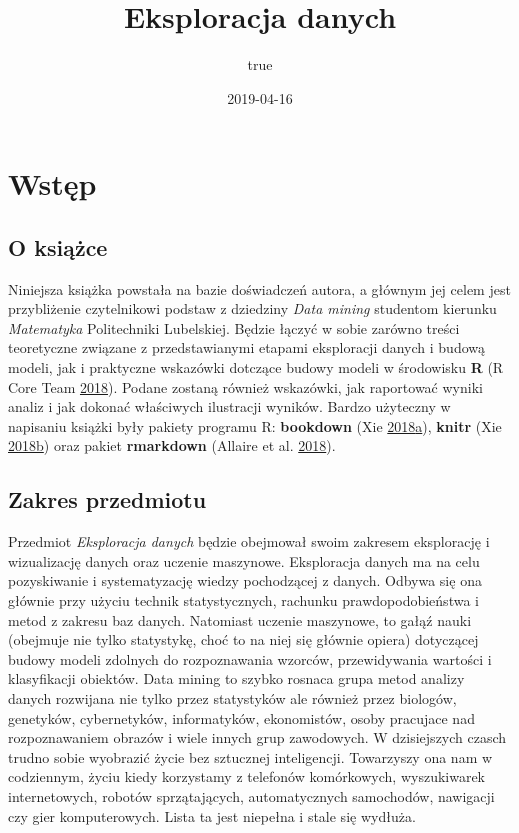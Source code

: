 \documentclass[]{book}
\title{Eksploracja danych}
\author{true}
\date{2019-04-16}
\theoremstyle{plain}
\theoremstyle{definition}
\theoremstyle{definition}
\theoremstyle{definition}
\theoremstyle{definition}
\theoremstyle{remark}
\begin{document}
\maketitle

{
\setcounter{tocdepth}{1}
\tableofcontents
}
\hypertarget{wstep}{%
\chapter*{Wstęp}\label{wstep}}

\hypertarget{o-ksiazce}{%
\section*{O książce}\label{o-ksiazce}}

Niniejsza książka powstała na bazie doświadczeń autora, a głównym jej celem jest przybliżenie czytelnikowi podstaw z dziedziny \emph{Data mining} studentom kierunku \emph{Matematyka} Politechniki Lubelskiej. Będzie łączyć w sobie zarówno treści teoretyczne związane z przedstawianymi etapami eksploracji danych i budową modeli, jak i praktyczne wskazówki dotczące budowy modeli w środowisku \textbf{R} (R Core Team \protect\hyperlink{ref-R-base}{2018}). Podane zostaną również wskazówki, jak raportować wyniki analiz i jak dokonać właściwych ilustracji wyników. Bardzo użyteczny w napisaniu książki były pakiety programu R: \textbf{bookdown} (Xie \protect\hyperlink{ref-R-bookdown}{2018}\protect\hyperlink{ref-R-bookdown}{a}), \textbf{knitr} (Xie \protect\hyperlink{ref-R-knitr}{2018}\protect\hyperlink{ref-R-knitr}{b}) oraz pakiet \textbf{rmarkdown} (Allaire et al. \protect\hyperlink{ref-R-rmarkdown}{2018}).

\hypertarget{zakres-przedmiotu}{%
\section*{Zakres przedmiotu}\label{zakres-przedmiotu}}

Przedmiot \emph{Eksploracja danych} będzie obejmował swoim zakresem eksplorację i wizualizację danych oraz uczenie maszynowe. Eksploracja danych ma na celu pozyskiwanie i systematyzację wiedzy pochodzącej z danych. Odbywa się ona głównie przy użyciu technik statystycznych, rachunku prawdopodobieństwa i metod z zakresu baz danych. Natomiast uczenie maszynowe, to gałąź nauki (obejmuje nie tylko statystykę, choć to na niej się głównie opiera) dotyczącej budowy modeli zdolnych do rozpoznawania wzorców, przewidywania wartości i klasyfikacji obiektów. Data mining to szybko rosnaca grupa metod analizy danych rozwijana nie tylko przez statystyków ale również przez biologów, genetyków, cybernetyków, informatyków, ekonomistów, osoby pracujace nad rozpoznawaniem obrazów i wiele innych grup zawodowych. W dzisiejszych czasch trudno sobie wyobrazić życie bez sztucznej inteligencji. Towarzyszy ona nam w codziennym, życiu kiedy korzystamy z telefonów komórkowych, wyszukiwarek internetowych, robotów sprzątających, automatycznych samochodów, nawigacji czy gier komputerowych. Lista ta jest niepełna i stale się wydłuża.
\end{document}

